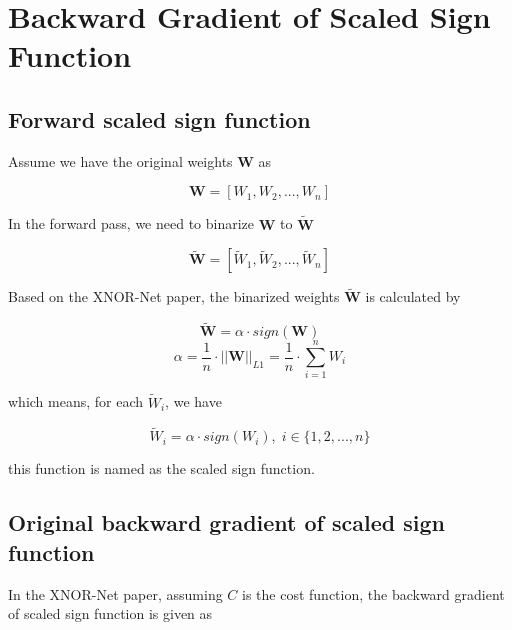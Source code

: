 \documentclass[12pt]{article} %
\begin{document}

\section{Backward Gradient of Scaled Sign Function} %
\subsection{Forward scaled sign function}
Assume we have the original weights $\mathbf{W}$ as

\begin{equation}
	\mathbf{W}=[W_{1},W_{2}, ..., W_{n}]
\end{equation}

In the forward pass, we need to binarize $\mathbf{W}$ to $\mathbf{\widetilde{W}}$

\begin{equation}
	\mathbf{\widetilde{W}}=[\widetilde{W}_{1},\widetilde{W}_{2}, ..., \widetilde{W}_{n}]
\end{equation}

Based on the XNOR-Net paper, the binarized weights $\mathbf{\widetilde{W}}$ is calculated by

\begin{equation}
	\mathbf{\widetilde{W}}=\alpha \cdot sign(\mathbf{W})
\end{equation}
\begin{equation}
	\alpha = \frac{1}{n} \cdot {||\mathbf{W}||}_{L1} = \frac{1}{n} \cdot
	\sum_{i=1}^{n} W_{i}
\end{equation}

which means, for each $\widetilde{W}_{i}$, we have

\begin{equation}
	\widetilde{W}_{i} =\alpha \cdot sign(W_{i}), \; i \in \{1,2,...,n\}
\end{equation}

this function is named as the scaled sign function.


\subsection{Original backward gradient of scaled sign function}
In the XNOR-Net paper, assuming $C$ is the cost function, the backward gradient of scaled sign function is given as
\end{document}
